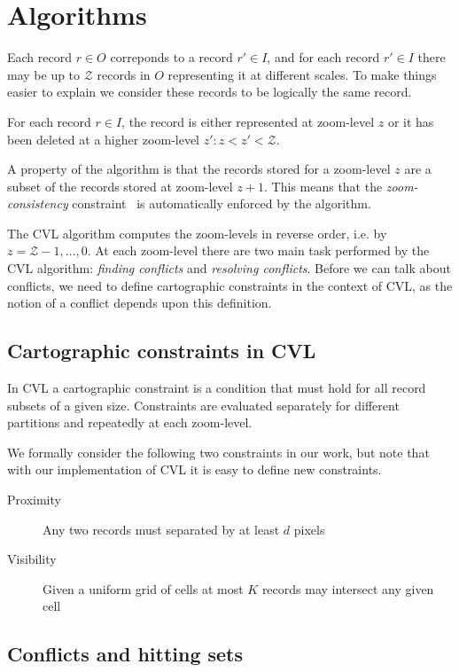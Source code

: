 \section{Algorithms}
\label{sec:algorithms}


Each record $r \in O$ correponds to a record $r' \in I$, and for each record $r' \in I$ there may be up to $\mathcal{Z}$ records in $O$ representing it at different scales. To make things easier to explain we consider these records to be logically the same record.

For each record $r \in I$, the record is either represented at zoom-level $z$ or it has been deleted at a higher zoom-level $z': z < z' < \mathcal{Z}$.

A property of the algorithm is that the records stored for a zoom-level $z$ are a subset of the records stored at zoom-level $z+1$. This means that the \emph{zoom-consistency} constraint~\cite{fusiontables} is automatically enforced by the algorithm.

The CVL algorithm computes the zoom-levels in reverse order, i.e. by $z = \mathcal{Z}-1, \dots, 0$. At each zoom-level there are two main task performed by the CVL algorithm: \emph{finding conflicts} and \emph{resolving conflicts}. Before we can talk about conflicts, we need to define cartographic constraints in the context of CVL, as the notion of a conflict depends upon this definition.

\subsection{Cartographic constraints in CVL}

In CVL a cartographic constraint is a condition that must hold for all record subsets of a given size. Constraints are evaluated separately for different partitions and repeatedly at each zoom-level.

We formally consider the following two constraints in our work, but note that with our implementation of CVL it is easy to define new constraints. 

\begin{description}
\item [Proximity] Any two records must separated by at least $d$ pixels
\item [Visibility] Given a uniform grid of cells at most $K$ records may intersect any given cell
\end{description}

\subsection{Conflicts and hitting sets}


